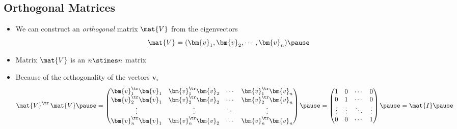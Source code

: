 \begin{slide}
\section[-2]{Orthogonal Matrices}

\begin{PauseHighLight}
  \begin{itemize}
  \item We can construct an \emph{orthogonal} matrix $\mat{V}$ from the
    eigenvectors
    \begin{displaymath}
      \mat{V} = (\bm{v}_1, \bm{v}_2 , \cdots, \bm{v}_n)\pause
    \end{displaymath}
    \vspace*{-1cm}
  \item Matrix $\mat{V}$ is an $n\stimes n$ matrix\pause
  \item Because of the orthogonality of the vectors $\bm{v}_i$
    \begin{displaymath}
      \mat{V}^\tr \, \mat{V} \pause =
      \begin{pmatrix}
        \bm{v}^\tr_1 \bm{v}_1 & \bm{v}^\tr_1 \bm{v}_2 & \cdots &
        \bm{v}^\tr_1 \bm{v}_n
        \\
        \bm{v}^\tr_2 \bm{v}_1 & \bm{v}^\tr_2 \bm{v}_2 & \cdots &
        \bm{v}^\tr_2 \bm{v}_n
        \\
        \vdots & \vdots & \ddots & \vdots
        \\
        \bm{v}^\tr_n \bm{v}_1 & \bm{v}^\tr_n \bm{v}_2 & \cdots &
        \bm{v}^\tr_n \bm{v}_n
      \end{pmatrix} \pause =
      \begin{pmatrix}
        1 & 0 & \cdots & 0 \\
        0 & 1 & \cdots & 0 \\
        \vdots & \vdots & \ddots & \vdots \\
        0 & 0 & \cdots & 1
      \end{pmatrix} \pause
      = \mat{I}\pause
    \end{displaymath}
  \end{itemize}
\end{PauseHighLight}

\end{slide}


